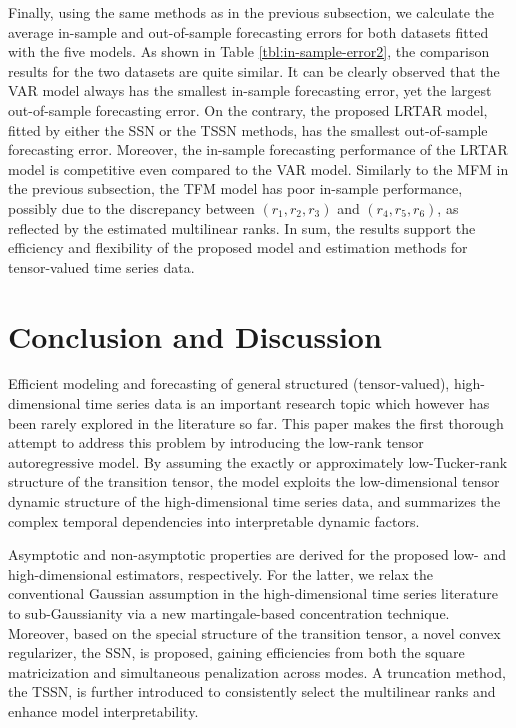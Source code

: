 \documentclass[12pt]{article}
\begin{document}
Finally, using the same methods as in the previous subsection, we calculate the average in-sample and out-of-sample forecasting errors for both datasets fitted with the five models. As shown in Table \ref{tbl:in-sample-error2}, the comparison results for the two datasets are quite similar.  It can be clearly observed that the VAR model always has the smallest  in-sample forecasting error, yet the largest out-of-sample forecasting error. On the contrary, the proposed LRTAR model, fitted by either the SSN or the TSSN methods, has the smallest out-of-sample forecasting error. Moreover, the in-sample forecasting performance of the LRTAR model is competitive even compared to the VAR model. Similarly to  the MFM in the previous subsection, the TFM model has poor in-sample performance, possibly due to the discrepancy between $(r_1,r_2, r_3)$ and $(r_4,r_5,r_6)$, as reflected by the estimated multilinear ranks. In sum, the results support the efficiency and flexibility of the proposed model and estimation methods for tensor-valued time series data.




\section{Conclusion and Discussion}\label{sec:conclusion}
Efficient modeling and forecasting of general structured (tensor-valued), high-dimensional time series data is an important research topic which however has been rarely explored in the literature so far. This paper makes the first thorough attempt to address this problem by introducing the low-rank tensor autoregressive model. By assuming the exactly or approximately low-Tucker-rank structure of the transition tensor, the model exploits the low-dimensional tensor dynamic structure of the high-dimensional time series data, and summarizes the complex temporal dependencies into interpretable dynamic factors. 

Asymptotic and non-asymptotic properties are derived for the proposed low- and high-dimensional estimators, respectively. For the latter, we relax the conventional Gaussian assumption in the high-dimensional time series literature to sub-Gaussianity via a new martingale-based concentration technique. Moreover, based on the special structure of the transition tensor, a novel convex regularizer, the SSN, is proposed, gaining  efficiencies from both the square matricization and simultaneous penalization across modes.  A truncation method, the TSSN, is further introduced to consistently select the multilinear ranks and enhance model interpretability. 
\end{document}
